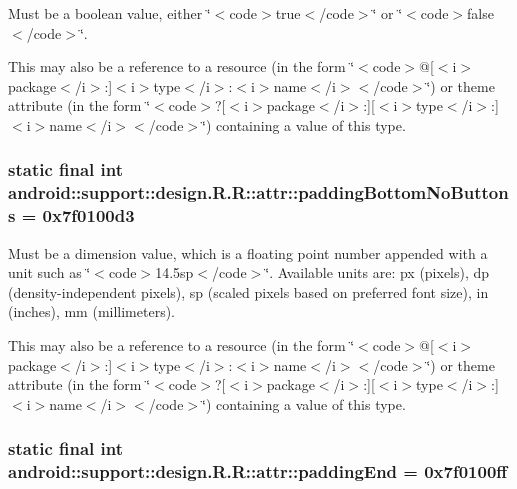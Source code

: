 Must be a boolean value, either \char`\"{}$<$code$>$true$<$/code$>$\char`\"{} or \char`\"{}$<$code$>$false$<$/code$>$\char`\"{}. 

This may also be a reference to a resource (in the form \char`\"{}$<$code$>$@\mbox{[}$<$i$>$package$<$/i$>$:\mbox{]}$<$i$>$type$<$/i$>$:$<$i$>$name$<$/i$>$$<$/code$>$\char`\"{}) or theme attribute (in the form \char`\"{}$<$code$>$?\mbox{[}$<$i$>$package$<$/i$>$:\mbox{]}\mbox{[}$<$i$>$type$<$/i$>$:\mbox{]}$<$i$>$name$<$/i$>$$<$/code$>$\char`\"{}) containing a value of this type. \hypertarget{classandroid_1_1support_1_1design_1_1_r_1_1attr_27a657d30d8b57182d607f771b2015de}{
\subsubsection[{paddingBottomNoButtons}]{\setlength{\rightskip}{0pt plus 5cm}static final int android::support::design.R.R::attr::paddingBottomNoButtons = 0x7f0100d3}}
\label{classandroid_1_1support_1_1design_1_1_r_1_1attr_27a657d30d8b57182d607f771b2015de}


Must be a dimension value, which is a floating point number appended with a unit such as \char`\"{}$<$code$>$14.5sp$<$/code$>$\char`\"{}. Available units are: px (pixels), dp (density-independent pixels), sp (scaled pixels based on preferred font size), in (inches), mm (millimeters). 

This may also be a reference to a resource (in the form \char`\"{}$<$code$>$@\mbox{[}$<$i$>$package$<$/i$>$:\mbox{]}$<$i$>$type$<$/i$>$:$<$i$>$name$<$/i$>$$<$/code$>$\char`\"{}) or theme attribute (in the form \char`\"{}$<$code$>$?\mbox{[}$<$i$>$package$<$/i$>$:\mbox{]}\mbox{[}$<$i$>$type$<$/i$>$:\mbox{]}$<$i$>$name$<$/i$>$$<$/code$>$\char`\"{}) containing a value of this type. \hypertarget{classandroid_1_1support_1_1design_1_1_r_1_1attr_2040ef6ea39117bc5b939231c783979b}{
\subsubsection[{paddingEnd}]{\setlength{\rightskip}{0pt plus 5cm}static final int android::support::design.R.R::attr::paddingEnd = 0x7f0100ff}}
\label{classandroid_1_1support_1_1design_1_1_r_1_1attr_2040ef6ea39117bc5b939231c783979b}


